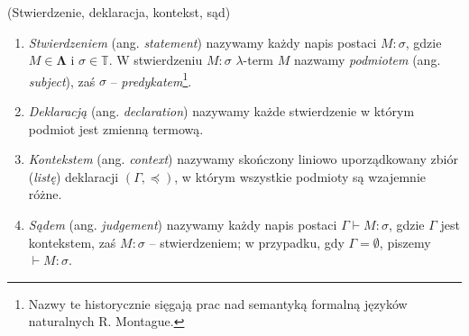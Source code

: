 
\begin{definicja}(Stwierdzenie, deklaracja, kontekst, sąd)\label{def:statement_simple}
  \begin{enumerate}[label=(\arabic*)]
  \setlength\itemsep{0em}
  \item \emph{Stwierdzeniem} (ang. \emph{statement}) nazywamy każdy napis postaci \(M:\sigma\), gdzie \(M\in\mathbf{\Lambda}\) i \(\sigma\in\mathbb{T}\). W stwierdzeniu \(M:\sigma\) \(\lambda\)-term \(M\) nazwamy \emph{podmiotem}  (ang. \emph{subject}), zaś \(\sigma\) -- \emph{predykatem}\footnote{Nazwy te historycznie sięgają prac nad semantyką formalną języków naturalnych R. Montague.}.
  \item \emph{Deklaracją} (ang. \emph{declaration}) nazywamy każde stwierdzenie w którym podmiot jest zmienną termową.
  \item \emph{Kontekstem} (ang. \emph{context}) nazywamy skończony liniowo uporządkowany zbiór (\emph{listę}) deklaracji \((\Gamma, \preceq)\), w którym wszystkie podmioty są wzajemnie różne.
  \item \emph{Sądem} (ang. \emph{judgement}) nazywamy każdy napis postaci \(\Gamma\vdash M:\sigma\), gdzie \(\Gamma\) jest kontekstem, zaś \(M:\sigma\) -- stwierdzeniem; w przypadku, gdy \(\Gamma = \emptyset\), piszemy \(\vdash M:\sigma\).  
  \end{enumerate}
\end{definicja}

